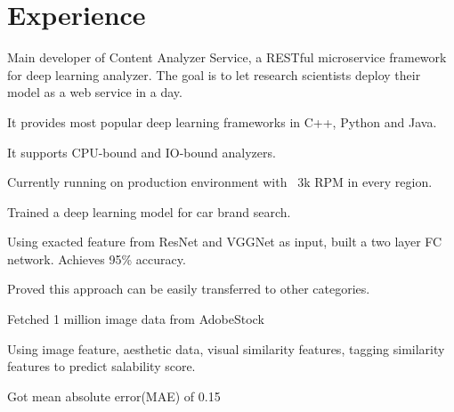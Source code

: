 \documentclass[letterpaper]{deedy-resume} %
\begin{document}
\hfill
%
%
\begin{minipage}[t]{0.66\textwidth} %


\section{Experience}


\sectionspace

\vspace{\topsep} %
\begin{tightitemize}
\item Main developer of Content Analyzer Service, a RESTful microservice framework for deep learning analyzer. The goal is to let research scientists deploy their model as a web service in a day.
\item It provides most popular deep learning frameworks in C++, Python and Java. 
\item It supports CPU-bound and IO-bound analyzers.
\item Currently running on production environment with ~3k RPM in every region.
\end{tightitemize}
\begin{tightitemize}
\item Trained a deep learning model for car brand search.
\item Using exacted feature from ResNet and VGGNet as input, built a two layer FC network. Achieves 95\% accuracy.
\item Proved this approach can be easily transferred to other categories.
\end{tightitemize}
\begin{tightitemize}
\item Fetched 1 million image data from AdobeStock
\item Using image feature, aesthetic data, visual similarity features, tagging similarity features to predict salability score.
\item Got mean absolute error(MAE) of 0.15
\end{tightitemize}


\end{minipage}
\end{document}
